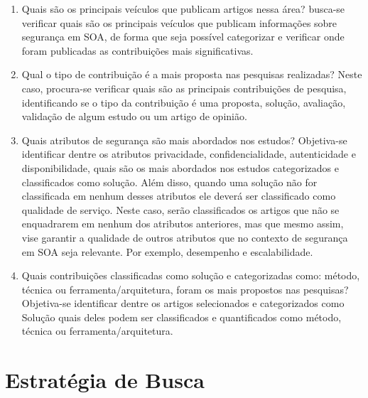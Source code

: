 \begin{enumerate}[ QP1 )]

    \item Quais são os principais veículos que publicam artigos nessa área?
    busca-se verificar quais são os principais veículos que publicam informações sobre segurança em SOA, de forma que seja possível categorizar e verificar onde foram publicadas as contribuições mais significativas.
	
	\item Qual o tipo de contribuição é a mais proposta nas pesquisas realizadas?
    Neste caso, procura-se verificar quais são as principais contribuições de pesquisa, identificando se o tipo da contribuição é uma proposta, solução, avaliação, validação de algum estudo ou um artigo de opinião.


	\item Quais atributos de segurança são mais abordados nos estudos? Objetiva-se identificar dentre os atributos privacidade, confidencialidade, autenticidade e disponibilidade,  quais são os mais abordados nos estudos categorizados e classificados como solução. Além disso, quando uma solução não for classificada em nenhum desses atributos ele deverá ser classificado como qualidade de serviço. Neste caso, serão classificados os artigos que não se enquadrarem em nenhum dos atributos anteriores, mas que mesmo assim, vise garantir a qualidade de outros atributos que no contexto de segurança em SOA seja relevante. Por exemplo, desempenho e escalabilidade.

    \item Quais contribuições classificadas como solução e categorizadas como: método, técnica ou ferramenta/arquitetura, foram os mais propostos nas pesquisas? Objetiva-se identificar dentre os artigos selecionados e categorizados como Solução quais deles podem ser classificados e quantificados como método, técnica ou ferramenta/arquitetura.



\end{enumerate}

\section{Estratégia de Busca}\label{sec:Obj1}

